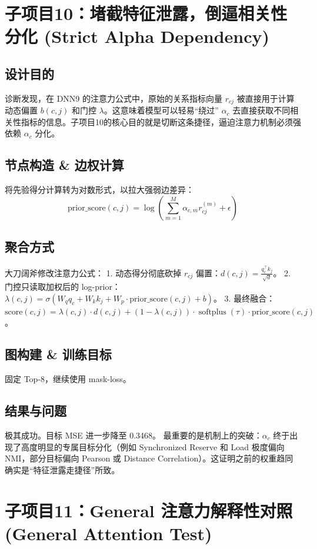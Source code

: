 \documentclass[UTF8]{ctexart}
\begin{document}
\section{子项目10：堵截特征泄露，倒逼相关性分化 (Strict Alpha Dependency)}

\subsection{设计目的}
诊断发现，在 DNN9 的注意力公式中，原始的关系指标向量 $r_{cj}$ 被直接用于计算动态偏置 $b(c,j)$ 和门控 $\lambda$。这意味着模型可以轻易“绕过” $\alpha_c$ 去直接获取不同相关性指标的信息。子项目10的核心目的就是切断这条捷径，逼迫注意力机制必须强依赖 $\alpha_c$ 分化。

\subsection{节点构造 \& 边权计算}
将先验得分计算转为对数形式，以拉大强弱边差异：
\[
\text{prior\_score}(c,j) = \log\left(\sum_{m=1}^M \alpha_{c,m} r_{cj}^{(m)} + \epsilon\right)
\]

\subsection{聚合方式}
大刀阔斧修改注意力公式：
1. 动态得分彻底砍掉 $r_{cj}$ 偏置：$d(c,j) = \frac{q_c^\top k_j}{\sqrt{d}}$。
2. 门控只读取加权后的 log-prior：$\lambda(c,j) = \sigma(W_q q_c + W_k k_j + W_p \cdot \text{prior\_score}(c,j) + b)$。
3. 最终融合：$\text{score}(c,j) = \lambda(c,j) \cdot d(c,j) + (1-\lambda(c,j)) \cdot \operatorname{softplus}(\tau) \cdot \text{prior\_score}(c,j)$。

\subsection{图构建 \& 训练目标}
固定 Top-8，继续使用 mask-loss。

\subsection{结果与问题}
极其成功。目标 MSE 进一步降至 0.3468。
最重要的是机制上的突破：$\alpha_c$ 终于出现了高度明显的专属目标分化（例如 Synchronized Reserve 和 Load 极度偏向 NMI，部分目标偏向 Pearson 或 Distance Correlation）。这证明之前的权重趋同确实是“特征泄露走捷径”所致。

\section{子项目11：General 注意力解释性对照 (General Attention Test)}
\end{document}
